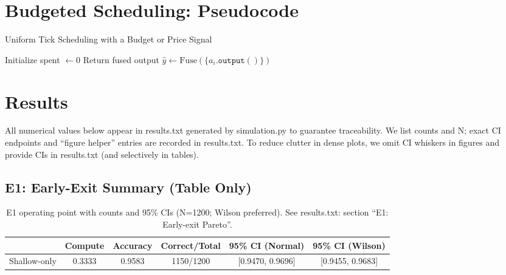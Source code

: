 \section{Budgeted Scheduling: Pseudocode}
\label{sec:algo}
\begin{adjustbox}{width=\linewidth}
\begin{minipage}{\linewidth}
\begin{algorithm}[H]
\DontPrintSemicolon
\caption{Uniform Tick Scheduling with a Budget or Price Signal}
Initialize spent $\leftarrow 0$\;
Return fused output $\hat{y} \leftarrow \text{Fuse}(\{a_i.\texttt{output}()\})$\;
\end{algorithm}
\end{minipage}
\end{adjustbox}

\section{Results}
\label{sec:results}
All numerical values below appear in results.txt generated by simulation.py to guarantee traceability. We list counts and N; exact CI endpoints and “figure helper” entries are recorded in results.txt. To reduce clutter in dense plots, we omit CI whiskers in figures and provide CIs in results.txt (and selectively in tables).

\subsection{E1: Early-Exit Summary (Table Only)}
\begin{table}[H]
  \centering
  \caption{E1 operating point with counts and 95\% CIs (N=1200; Wilson preferred). See results.txt: section ``E1: Early-exit Pareto''.}
  \vspace{0.25em}
  \begin{adjustbox}{width=\linewidth}
  \begin{tabular}{l c c c c c}
    \toprule
    & Compute & Accuracy & Correct/Total & 95\% CI (Normal) & 95\% CI (Wilson) \\
    \midrule
    Shallow-only & 0.3333 & 0.9583 & 1150/1200 & [0.9470, 0.9696] & [0.9455, 0.9683] \\
    \bottomrule
  \end{tabular}
  \end{adjustbox}
\end{table}

